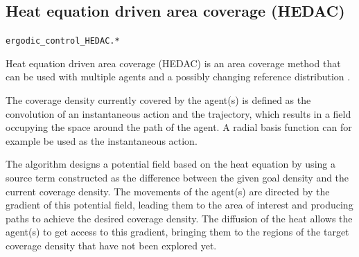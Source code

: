 \documentclass[10pt,a4paper]{article} %
\newcommand{\filename}[1]{\colorbox{rr2}{\color{white}\texttt{#1}}}
\begin{document}

\newpage

\subsection{Heat equation driven area coverage (HEDAC)}\label{sec:HEDAC}
\begin{flushright}
\filename{ergodic\_control\_HEDAC.*}
\end{flushright}

Heat equation driven area coverage (HEDAC) is an area coverage method that can be used with multiple agents and a possibly changing reference distribution \cite{Ivic17}. 

The coverage density currently covered by the agent(s) is defined as the convolution of an instantaneous action and the trajectory, which results in a field occupying the space around the path of the agent. A radial basis function can for example be used as the instantaneous action. 

The algorithm designs a potential field based on the heat equation by using a source term constructed as the difference between the given goal density and the current coverage density. The movements of the agent(s) are directed by the gradient of this potential field, leading them to the area of interest and producing paths to achieve the desired coverage density. The diffusion of the heat allows the agent(s) to get access to this gradient, bringing them to the regions of the target coverage density that have not been explored yet.
\end{document}
